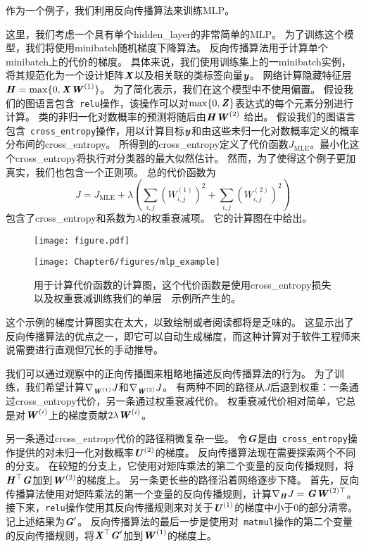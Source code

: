 作为一个例子，我们利用反向传播算法来训练\gls{MLP}。

这里，我们考虑一个具有单个\gls{hidden_layer}的非常简单的\gls{MLP}。
为了训练这个模型，我们将使用\gls{minibatch}随机梯度下降算法。
反向传播算法用于计算单个\gls{minibatch}上的代价的梯度。
具体来说，我们使用训练集上的一\gls{minibatch}实例，将其规范化为一个设计矩阵$\boldsymbol{\mathit{X}}$以及相关联的类标签向量$\boldsymbol{\mathit{y}}$。
网络计算隐藏特征层$\boldsymbol{\mathit{H}}=\max\{0, \boldsymbol{\mathit{X}}\boldsymbol{\mathit{W}}^{(1)}\}$。
为了简化表示，我们在这个模型中不使用偏置。
假设我们的图语言包含~\verb|relu|操作，该操作可以对$\max\{0,\boldsymbol{\mathit{Z}}\}$表达式的每个元素分别进行计算。
类的非归一化对数概率的预测将随后由$\boldsymbol{\mathit{H}}\boldsymbol{\mathit{W}}^{(2)}$ 给出。
假设我们的图语言包含~\verb|cross_entropy|操作，用以计算目标$\boldsymbol{\mathit{y}}$和由这些未归一化对数概率定义的概率分布间的\gls{cross_entropy}。
所得到的\gls{cross_entropy}定义了代价函数$J_\text{MLE}$。最小化这个\gls{cross_entropy}将执行对分类器的最大似然估计。
然而，为了使得这个例子更加真实，我们也包含一个正则项。
总的代价函数为
\begin{equation}
  J = J_{\text{MLE}} + \lambda \left ( \sum_{i, j} \left (W_{i, j}^{(1)} \right )^2 + \sum_{i, j} \left (W_{i, j}^{(2)} \right)^2 \right )
\end{equation}
包含了\gls{cross_entropy}和系数为$\lambda$的权重衰减项。
它的计算图在中给出。
\begin{figure}[!htb]
\ifOpenSource
\centerline{\texttt{[image: figure.pdf]}}
\else
\centerline{\texttt{[image: Chapter6/figures/mlp\_example]}}
\fi
\caption{用于计算代价函数的计算图，这个代价函数是使用\gls{cross_entropy}损失以及权重衰减训练我们的单层~~示例所产生的。}
\label{fig:chap6_mlp_example}
\end{figure}

这个示例的梯度计算图实在太大，以致绘制或者阅读都将是乏味的。
这显示出了反向传播算法的优点之一，即它可以自动生成梯度，而这种计算对于软件工程师来说需要进行直观但冗长的手动推导。

我们可以通过观察中的正向传播图来粗略地描述反向传播算法的行为。
为了训练，我们希望计算$\nabla_{\boldsymbol{\mathit{W}}^{(1)}} J$和$\nabla_{\boldsymbol{\mathit{W}}^{(2)}} J$。
有两种不同的路径从$J$后退到权重：一条通过\gls{cross_entropy}代价，另一条通过权重衰减代价。
权重衰减代价相对简单，它总是对$\boldsymbol{\mathit{W}}^{(i)}$上的梯度贡献$2\lambda \boldsymbol{\mathit{W}}^{(i)}$。
  
  
另一条通过\gls{cross_entropy}代价的路径稍微复杂一些。
令$\boldsymbol{\mathit{G}}$是由~\verb|cross_entropy|操作提供的对未归一化对数概率$\boldsymbol{\mathit{U}}^{(2)}$的梯度。
反向传播算法现在需要探索两个不同的分支。
在较短的分支上，它使用对矩阵乘法的第二个变量的反向传播规则，将$\boldsymbol{\mathit{H}}^\top \boldsymbol{\mathit{G}}$加到$\boldsymbol{\mathit{W}}^{(2)}$的梯度上。
另一条更长些的路径沿着网络逐步下降。
首先，反向传播算法使用对矩阵乘法的第一个变量的反向传播规则，计算$\nabla_{\boldsymbol{\mathit{H}}} J = \boldsymbol{\mathit{G}}\boldsymbol{\mathit{W}}^{(2)\top}$。
接下来，\verb|relu|操作使用其反向传播规则来对关于$\boldsymbol{\mathit{U}}^{(1)}$的梯度中小于0的部分清零。记上述结果为$\boldsymbol{\mathit{G}}'$。 
反向传播算法的最后一步是使用对~\verb|matmul|操作的第二个变量的反向传播规则，将$\boldsymbol{\mathit{X}}^\top \boldsymbol{\mathit{G}}'$加到$\boldsymbol{\mathit{W}}^{(1)}$的梯度上。

